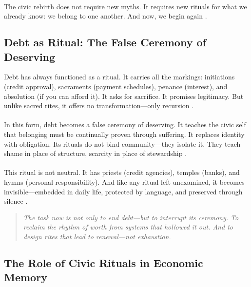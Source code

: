 \documentclass[12pt]{article}
\begin{document}
\paragraph{}The civic rebirth does not require new myths. It requires new rituals for what we already know: we belong to one another. And now, we begin again \citep{hooks2003teaching}.

\subsection{Debt as Ritual: The False Ceremony of Deserving}

Debt has always functioned as a ritual. It carries all the markings: initiations (credit approval), sacraments (payment schedules), penance (interest), and absolution (if you can afford it). It asks for sacrifice. It promises legitimacy. But unlike sacred rites, it offers no transformation—only recursion \citep{morris2014debt}.

\paragraph{}In this form, debt becomes a false ceremony of deserving. It teaches the civic self that belonging must be continually proven through suffering. It replaces identity with obligation. Its rituals do not bind community—they isolate it. They teach shame in place of structure, scarcity in place of stewardship \citep{fraser2003justice,brown1995states}.

\paragraph{}This ritual is not neutral. It has priests (credit agencies), temples (banks), and hymns (personal responsibility). And like any ritual left unexamined, it becomes invisible—embedded in daily life, protected by language, and preserved through silence \citep{levinas1969totality,ahmed2004cultural}.

\begin{quote}
    \emph{The task now is not only to end debt—but to interrupt its ceremony. To reclaim the rhythm of worth from systems that hollowed it out. And to design rites that lead to renewal—not exhaustion.}
\end{quote}

\subsection{The Role of Civic Rituals in Economic Memory}
\end{document}
